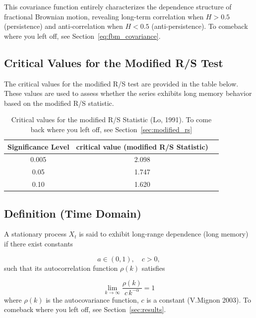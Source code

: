 \documentclass[11pt]{extarticle}
\begin{document}
This covariance function entirely characterizes the dependence structure of fractional Brownian motion, revealing long-term correlation when \(H>0.5\) (persistence) and anti-correlation when \(H<0.5\) (anti-persistence).
To comeback where you left off, see Section~\ref{eq:fbm_covariance}. \\

\subsection{Critical Values for the Modified R/S Test}

The critical values for the modified R/S test are provided in the table below. These values are used to assess whether the series exhibits long memory behavior based on the modified R/S statistic.

\begin{table}[ht!]
\centering
\begin{tabular}{|c|c|c|}
\hline
\textbf{Significance Level} & \textbf{critical value (modified R/S Statistic)} \\
\hline
0.005 & 2.098\\
0.05 & 1.747\\
0.10 & 1.620\\

\hline
\end{tabular}
\caption{Critical values for the modified R/S Statistic (Lo, 1991). To come back where you left off, see Section~\ref{sec:modified_rs}}
    \label{table:critical_values}
\end{table}

\subsection{Definition (Time Domain)}
\label{sec:long_range_dependence}
A stationary process \(X_t\) is said to exhibit long‐range dependence (long memory) if there exist constants

\[
a\in(0,1),\quad c>0,
\]
such that its autocorrelation function \(\rho(k)\) satisfies

\begin{equation}
\lim_{k \to \infty}
\frac{\rho(k)}{c\,k^{-\alpha}}
=1
\end{equation}
where \(\rho(k)\) is the autocovariance function, \(c\) is a constant (V.Mignon 2003). To comeback where you left off,
see Section~\ref{sec:results}.
\end{document}
